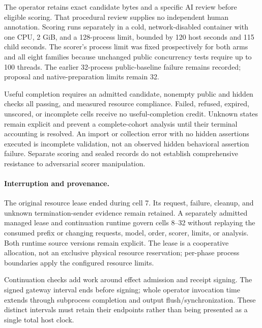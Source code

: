 The operator retains exact candidate bytes and a specific AI review before
eligible scoring. That procedural review supplies no independent human
annotation. Scoring runs separately in a cold, network-disabled container with
one CPU, 2 GiB, and a 128-process limit, bounded by 120 host seconds and 115
child seconds. The scorer's process limit was fixed prospectively for both
arms and all eight families because unchanged public concurrency tests require
up to 100 threads. The earlier 32-process public-baseline failure remains
recorded; proposal and native-preparation limits remain 32.

Useful completion requires an admitted candidate, nonempty public and hidden
checks all passing, and measured resource compliance. Failed, refused,
expired, unscored, or incomplete cells receive no useful-completion credit.
Unknown states remain explicit and prevent a complete-cohort analysis until
their terminal accounting is resolved. An import or collection error with
no hidden assertions executed is incomplete validation, not an observed
hidden behavioral assertion failure. Separate scoring and sealed records do
not establish comprehensive resistance to adversarial scorer manipulation.

\paragraph{Interruption and provenance.}
The original resource lease ended during cell 7. Its request, failure, cleanup,
and unknown termination-sender evidence remain retained. A separately admitted
managed lease and continuation runtime govern cells 8--32 without replaying
the consumed prefix or changing requests, model, order, scorer, limits, or
analysis. Both runtime source versions remain explicit. The lease is a
cooperative allocation, not an exclusive physical resource reservation;
per-phase process boundaries apply the configured resource limits.

Continuation checks add work around effect admission and receipt signing.
The signed gateway interval ends before signing; whole operator invocation
time extends through subprocess completion and output flush/synchronization.
These distinct intervals must retain their endpoints rather than being
presented as a single total host clock.

